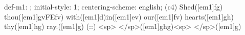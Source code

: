 def-m1: \grealign;
initial-style: 1;
centering-scheme: english;
(c4) Shed([em1]fg) thou([em1]gvFEfv) with([em1]d)in([em1]ev) our([em1]fv) hearts([em1]gh) thy([em1]hg) ray.([em1]g) (::) <sp> </sp>([em1]ghg)<sp>   </sp>([em1]g)